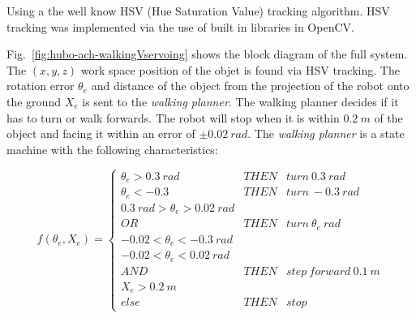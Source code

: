 




Using a the well know HSV (Hue Saturation Value) tracking algorithm.  
HSV tracking was implemented via the use of built in libraries in OpenCV\cite{opencv}.

Fig.~\ref{fig:hubo-ach-walkingVservoing} shows the block diagram of the full system. 
The $(x,y,z)$ work space position of the objet is found via HSV tracking.  
The rotation error $\theta_e$ and distance of the object from the projection of the robot onto the ground $X_e$ is sent to the \textit{walking planner}.  
The walking planner decides if it has to turn or walk forwards. 
The robot will stop when it is within $0.2~m$ of the object and facing it within an error of $\pm 0.02~rad$.
The \textit{walking planner} is a state machine with the following characteristics:

\begin{equation}
f(\theta_e,X_e) = \left\{
     \begin{array}{ccl}
       \theta_e > 0.3~rad  & THEN & turn~0.3~rad\\
       \hline
       \theta_e < -0.3 & THEN & turn~-0.3~rad\\
       \hline
       0.3~rad > \theta_e > 0.02~rad && \\
       OR & THEN & turn~\theta_e~rad\\ 
       -0.02 < \theta_e < -0.3~rad & & \\
       \hline
        -0.02 < \theta_e < 0.02~rad &  &\\
        AND & THEN & step~forward~0.1~m\\
         X_e > 0.2~m &  &  \\
         \hline
        else & THEN & stop
     \end{array}
   \right.
\end{equation}



